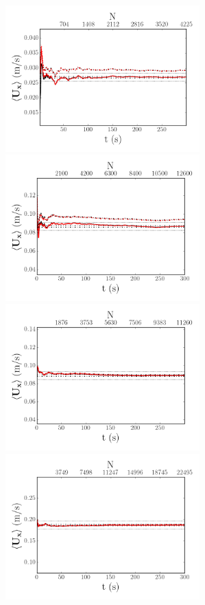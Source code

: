 \documentclass[12pt,oneside,a4paper]{article}
\begin{document}
\begin{figure}
\centering
\includegraphics[width=7.5cm]{images/LDA_timeDependenceImages/4hz_x_400_z_1_MeanUx.png}\hfill
\includegraphics[width=7.5cm]{images/LDA_timeDependenceImages/8hz_x_400_z_1_MeanUx.png}\\
\includegraphics[width=7.5cm]{images/LDA_timeDependenceImages/4hz_x_400_z_15_MeanUx.png}\hfill
\includegraphics[width=7.5cm]{images/LDA_timeDependenceImages/8hz_x_400_z_15_MeanUx.png}\\

\end{figure}
\end{document}
